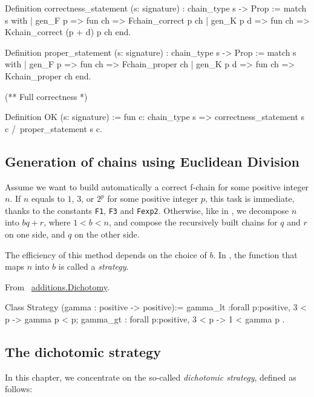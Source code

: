\begin{Coqsrc}
Definition correctness_statement (s: signature) : 
chain_type s -> Prop :=
match s  with
  | gen_F p => fun ch => Fchain_correct p ch
  | gen_K p d   => fun ch => Kchain_correct (p + d) p ch
end.

Definition proper_statement (s: signature) : 
chain_type s -> Prop :=
match s  with
  | gen_F p => fun ch => Fchain_proper ch 
  | gen_K p d   => fun ch => Kchain_proper ch 
end.

(**  Full correctness *)

Definition  OK (s: signature) 
  := fun c: chain_type s => 
       correctness_statement s c /\
       proper_statement s c.

\end{Coqsrc}

\subsection{Generation of chains using Euclidean Division}

Assume we want to build automatically a correct  f-chain for some 
positive integer $n$.
If $n$ equals to $1$, $3$, or $2^p$ for some positive integer  $p$,
this task is immediate, thanks to the constants \texttt{F1}, 
\texttt{F3} and \texttt{Fexp2}.
Otherwise, like in \cite{DBLP:journals/ita/BrlekCHM95}, we decompose 
$n$ into $bq+r$, where $1<b<n$, and compose the recursively built
chains for $q$ and $r$ on one side, and $q$ on the other side.

The efficiency of this method depends on the choice of $b$.
In \cite{DBLP:journals/ita/BrlekCHM95}, the function that maps $n$ into $b$
is called a \emph{strategy}. 

\vspace{4pt}
\noindent
From ~\href{../theories/html/additions.Dichotomy.html}{additions.Dichotomy}.
\begin{Coqsrc}
Class Strategy (gamma : positive -> positive):=
{
gamma_lt :forall p:positive, 3 < p -> gamma  p < p;
gamma_gt : forall p:positive, 3 < p -> 1 < gamma  p
}.

\end{Coqsrc}
\subsection{The dichotomic strategy}


In this chapter, we concentrate
on the so-called \emph{dichotomic strategy}, defined as follows:

